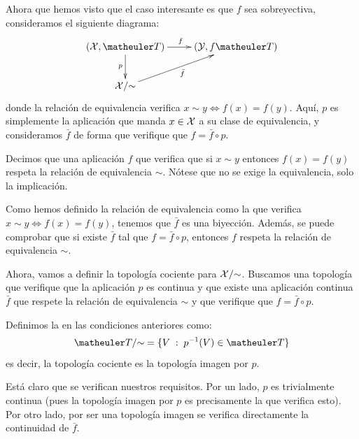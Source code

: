Ahora que hemos visto que el caso interesante es que $f$ sea sobreyectiva, consideramos el siguiente diagrama:
\[\xymatrix{
	(\X,\T) \ar[r]^{f} \ar[d]_{p} &
	(\mc{Y}, f\T) \\
	\X/\mathord{\sim}  \ar[ru]_{\bar{f}}
}\]
donde la relación de equivalencia verifica $x\sim y\iff f(x)=f(y)$. Aquí, $p$ es simplemente la aplicación que manda $x\in\mathcal{X}$ a su clase de equivalencia, y consideramos $\bar{f}$ de forma que verifique que $f=\bar{f}\circ p$.

Decimos que una aplicación $f$ que verifica que si $x\sim y$ entonces $f(x)=f(y)$ respeta la relación de equivalencia $\mathord{\sim}$. Nótese que no se exige la equivalencia, solo la implicación.

Como hemos definido la relación de equivalencia como la que verifica $x\sim y\iff f(x)=f(y)$, tenemos que $\bar{f}$ es una biyección. Además, se puede comprobar que si existe $\bar{f}$ tal que $f=\bar{f}\circ p$, entonces $f$ respeta la relación de equivalencia $\mathord{\sim}$.

Ahora, vamos a definir la topología cociente para $\mathcal{X}/\mathord{\sim}$. Buscamos una topología que verifique que la aplicación $p$ es continua y que existe una aplicación continua $\bar{f}$ que respete la relación de equivalencia $\mathord{\sim}$ y que verifique que $f=\bar{f}\circ p$.

\begin{defi}
	Definimos la  en las condiciones anteriores como:
	\[\T/\mathord{\sim} = \{V\midc p^{-1}(V)\in\T\}\]
	es decir, la topología cociente es la topología imagen por $p$.
\end{defi}

Está claro que se verifican nuestros requisitos. Por un lado, $p$ es trivialmente continua (pues la topología imagen por $p$ es precisamente la que verifica esto). Por otro lado, por ser una topología imagen se verifica directamente la continuidad de $\bar{f}$.

